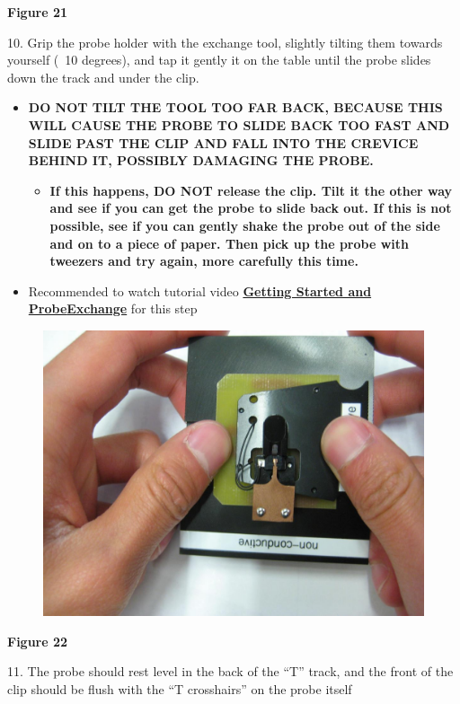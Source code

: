 \documentclass{../lab}
\begin{document}
\textbf{Figure 21}

10.  Grip the probe holder with the exchange tool, slightly tilting them towards yourself (~10 degrees), and tap it gently it on the table until the probe slides down the track and under the clip.

\begin{itemize}
    \item \textbf{DO NOT TILT THE TOOL TOO FAR BACK, BECAUSE THIS WILL CAUSE THE PROBE TO SLIDE BACK TOO FAST AND SLIDE PAST THE CLIP AND FALL INTO THE CREVICE BEHIND IT, POSSIBLY DAMAGING THE PROBE.}
    \begin{itemize}
        \item \textbf{If this happens, DO NOT release the clip. Tilt it the other way and see if you can get the probe to slide back out.  If this is not possible, see if you can gently shake the probe out of the side and on to a piece of paper. Then pick up the probe with tweezers and try again, more carefully this time.}

    \end{itemize}

    \item Recommended to watch tutorial video \href{http://experimentationlab.berkeley.edu/sites/default/files/gettingstarted\_final2.mp4}{\textbf{Getting Started and Probe}}\href{http://experimentationlab.berkeley.edu/sites/default/files/gettingstarted\_final2.mp4}{\textbf{Exchange}} for this step

\end{itemize}


\begin{figure}[h]
    \centering
    \href{http://dev-physicsadv.pantheon.berkeley.edu/sites/default/files/AFMImages/22.JPG}{\includegraphics[width=0.5\linewidth]{images/22.JPG}}
    \caption{}
    \label{fig:22}
\end{figure}

\textbf{Figure 22}

11.  The probe should rest level in the back of the ``T'' track, and the front of the clip should be flush with the ``T crosshairs'' on the probe itself
\end{document}
